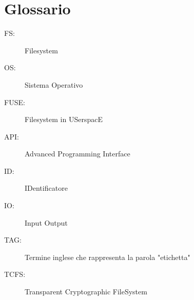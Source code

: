 \chapter{Glossario} 

\begin{description}
    \item[FS:] Filesystem
    \item [OS: ] Sistema Operativo
    \item [FUSE: ] Filesystem in USerspacE
    \item [API: ] Advanced Programming Interface
    \item [ID: ] IDentificatore
    \item [IO: ] Input Output
    \item [TAG: ] Termine inglese che rappresenta la parola "etichetta"
    \item [TCFS: ] Transparent Cryptographic FileSystem
\end{description}
